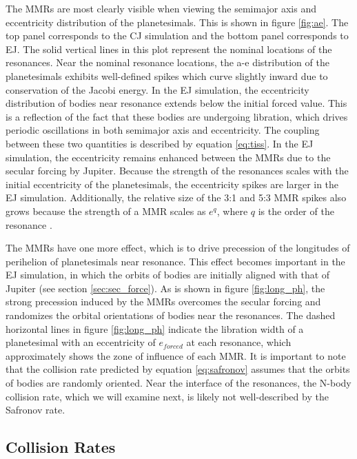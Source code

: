 \documentclass[onecolumn]{aastex63}
\begin{document}
The MMRs are most clearly visible when viewing the semimajor axis and eccentricity distribution of the planetesimals. This is shown 
in figure \ref{fig:ae}. The top panel corresponds to the CJ simulation and the bottom panel corresponds to EJ. The solid vertical lines 
in this plot represent the nominal locations of the resonances. Near the nominal resonance locations, the a-e distribution of the 
planetesimals exhibits well-defined spikes which curve slightly inward due to conservation of the Jacobi energy. In the EJ simulation, 
the eccentricity distribution of bodies near resonance extends below the initial forced value. This is a reflection of the fact that these 
bodies are undergoing libration, which drives periodic oscillations in both semimajor axis and eccentricity. The coupling between 
these two quantities is described by equation \ref{eq:tiss}. In the EJ simulation, the eccentricity remains enhanced between the 
MMRs due to the secular forcing by Jupiter. Because the strength of the resonances scales with the initial eccentricity of the planetesimals, 
the eccentricity spikes are larger in the EJ simulation. Additionally, the relative size of the 3:1 and 5:3 MMR spikes also grows because the 
strength of a MMR scales as $e^{q}$, where $q$ is the order of the resonance \citep{1994PhyD...77..289M}.

The MMRs have one more effect, which is to drive precession of the longitudes of perihelion of planetesimals near 
resonance. This effect becomes important in the EJ simulation, in which the orbits of bodies are initially aligned with that of Jupiter 
(see section \ref{sec:sec_force}). As is shown in figure \ref{fig:long_ph}, the strong precession induced by the MMRs overcomes the 
secular forcing and randomizes the orbital orientations of bodies near the resonances. The dashed horizontal lines in figure 
\ref{fig:long_ph} indicate the libration width of a planetesimal with an eccentricity of $e_{forced}$ at each resonance, which 
approximately shows the zone of influence of each MMR. It is important to note that the collision rate predicted by equation
\ref{eq:safronov} assumes that the orbits of bodies are randomly oriented. Near the interface of the resonances, the N-body collision rate, 
which we will examine next, is likely not well-described by the Safronov rate.

\subsection{Collision Rates}\label{sec:coll_rates}
\end{document}
